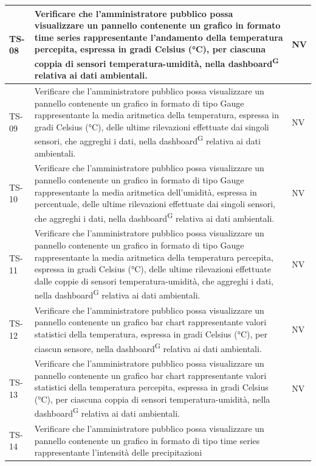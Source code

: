 \documentclass[8pt]{article}
\newcommand{\glossterm}[1]{#1\textsuperscript{G}} %
\begin{document}
\begin{longtable}{|>{\centering}p{2cm}|>{\RaggedRight}m{12cm}|>{\centering\arraybackslash}p{2cm}|}
    \hline 
    TS-08 & Verificare che l'amministratore pubblico possa visualizzare un pannello
    contenente un grafico in formato time series rappresentante l'andamento della temperatura
    percepita,
    espressa in gradi Celsius (°C), per ciascuna coppia di sensori temperatura-umidità, nella
    \glossterm{dashboard} relativa ai dati ambientali.
    & NV \\
    \hline
    TS-09 & Verificare che l'amministratore pubblico possa visualizzare un pannello contenente
    un grafico in formato di tipo Gauge rappresentante la media aritmetica della temperatura,
    espressa in gradi Celsius (°C), delle ultime rilevazioni effettuate dai singoli sensori, che aggreghi i dati, nella \glossterm{dashboard} relativa ai dati ambientali.
    & NV \\
    \hline
    TS-10 & Verificare che l'amministratore pubblico possa visualizzare un pannello contenente
    un grafico in formato di tipo Gauge rappresentante la media aritmetica dell'umidità,
    espressa in percentuale, delle ultime rilevazioni effettuate dai singoli sensori, che aggreghi i dati, nella \glossterm{dashboard} relativa ai dati ambientali.
    & NV \\
    \hline
    TS-11 & Verificare che l'amministratore pubblico possa visualizzare un pannello contenente
    un grafico in formato di tipo Gauge rappresentante la media aritmetica della temperatura percepita,
    espressa in gradi Celsius (°C), delle ultime rilevazioni effettuate dalle coppie di sensori temperatura-umidità, che aggreghi i dati, nella \glossterm{dashboard} relativa ai dati ambientali.
    & NV \\
    \hline
    TS-12 & Verificare che l'amministratore pubblico possa visualizzare un pannello contenente
    un grafico bar chart rappresentante valori statistici della temperatura,
    espressa in gradi Celsius (°C), per ciascun sensore, nella \glossterm{dashboard} relativa ai dati ambientali.
    & NV \\
    \hline
    TS-13 & Verificare che l'amministratore pubblico possa visualizzare un pannello contenente
    un grafico bar chart rappresentante valori statistici della temperatura percepita,
    espressa in gradi Celsius (°C), per ciascuna coppia di sensori temperatura-umidità, nella \glossterm{dashboard} relativa ai dati ambientali.
    & NV \\
    \hline
    TS-14 & Verificare che l'amministratore pubblico possa visualizzare un pannello contenente
    un grafico in formato di tipo time series rappresentante l'intensità delle precipitazioni

\end{longtable}
\end{document}
